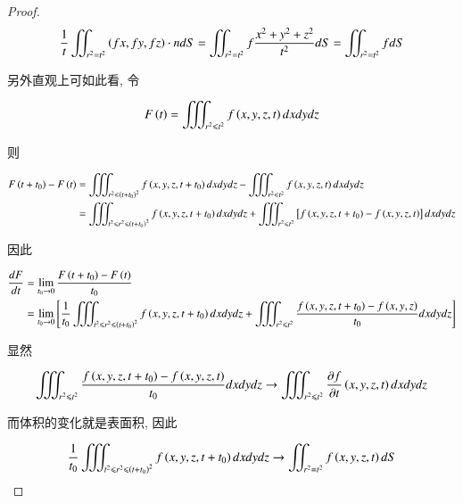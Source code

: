 \documentclass[11pt]{article}
\begin{document}
\begin{proof}
	\begin{equation}
	\frac{1}{t}\iint_{{r^2} = {t^2}} {\left( {fx,fy,fz} \right) \cdot ndS} = \iint_{{r^2} = {t^2}} {f\frac{{{x^2} + {y^2} + {z^2}}}{{{t^2}}}dS} = \iint_{{r^2} = {t^2}} {fdS}
	\notag
	\end{equation}
	
	另外直观上可如此看, 令
	
	\begin{equation}
	F\left( t \right) = \iiint_{{r^2} \leqslant {t^2}} {f\left( {x,y,z,t} \right)dxdydz}
	\notag
	\end{equation}
	
	则
	
	\begin{equation}
	\begin{split}
	F\left( {t + {t_0}} \right) - F\left( t \right) & = \iiint_{{r^2} \leqslant {{\left( {t + {t_0}} \right)}^2}} {f\left( {x,y,z,t + {t_0}} \right)dxdydz} - \iiint_{{r^2} \leqslant {t^2}} {f\left( {x,y,z,t} \right)dxdydz}\\
													& = \iiint_{{t^2} \leqslant {r^2} \leqslant {{\left( {t + {t_0}} \right)}^2}} {f\left( {x,y,z,t + {t_0}} \right)dxdydz} + \iiint_{{r^2} \leqslant {t^2}} {\left[ {f\left( {x,y,z,t + {t_0}} \right) - f\left( {x,y,z,t} \right)} \right]dxdydz}
	\end{split}
	\notag 
	\end{equation}
	
	因此
	
	\begin{equation}
	\begin{split}
	\frac{{dF}}{{dt}} & = \mathop {\lim }\limits_{{t_0} \to 0} \frac{{F\left( {t + {t_0}} \right) - F\left( t \right)}}{{{t_0}}}\\
					  & = \mathop {\lim }\limits_{{t_0} \to 0} \left[ {\frac{1}{{{t_0}}}\iiint_{{t^2} \leqslant {r^2} \leqslant {{\left( {t + {t_0}} \right)}^2}} {f\left( {x,y,z,t + {t_0}} \right)dxdydz} + \iiint_{{r^2} \leqslant {t^2}} {\frac{{f\left( {x,y,z,t + {t_0}} \right) - f\left( {x,y,z} \right)}}{{{t_0}}}dxdydz}} \right]
	\end{split}
	\notag 
	\end{equation}
	
	显然
	
	\begin{equation}
	\iiint_{{r^2} \leqslant {t^2}} {\frac{{f\left( {x,y,z,t + {t_0}} \right) - f\left( {x,y,z,t} \right)}}{{{t_0}}}dxdydz} \to \iiint_{{r^2} \leqslant {t^2}} {\frac{{\partial f}}{{\partial t}}\left( {x,y,z,t} \right)dxdydz}
	\notag 
	\end{equation}
	
	而体积的变化就是表面积, 因此
	
	\begin{equation}
	\frac{1}{{{t_0}}}\iiint_{{t^2} \leqslant {r^2} \leqslant {{\left( {t + {t_0}} \right)}^2}} {f\left( {x,y,z,t + {t_0}} \right)dxdydz} \to \iint_{{r^2} = {t^2}} {f\left( {x,y,z,t} \right)dS}
	\notag 
	\end{equation}
	
	
\end{proof}
\end{document}
